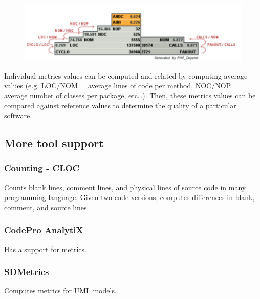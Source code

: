 \documentclass[a4paper,11pt]{report}
\begin{document}
\begin{figure}[h]
\center
\includegraphics[width=.5\textwidth]{figures/overview_pyramid.png}
\end{figure}

Individual metrics values can be computed and related by computing average
values (e.g. LOC/NOM = average lines of code per method, NOC/NOP = average
number of classes per package, etc\dots). Then, these metrics values can be
compared against reference values to determine the quality of a particular
software.

\subsection{More tool support}
\subsubsection{Counting - CLOC}
Counts blank lines, comment lines, and physical lines of source code in many
programming language. Given two code versions, computes differences in blank,
comment, and source lines.

\subsubsection{CodePro AnalytiX}
Has a support for metrics.

\subsubsection{SDMetrics}
Computes metrics for UML models.
\end{document}
